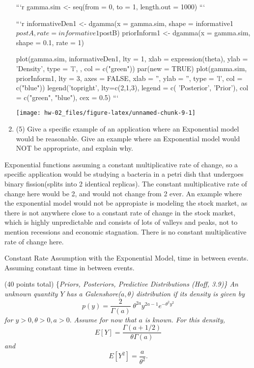 \documentclass[
]{article}
\begin{document}
\begin{enumerate}
```r
gamma.sim <- seq(from = 0, to = 1, length.out = 1000)
```

```r
informativeDen1 <- dgamma(x = gamma.sim, shape = informative1$postA, 
 rate = informative1$postB)
priorInform1 <- dgamma(x = gamma.sim, shape = 0.1, 
 rate = 1)

plot(gamma.sim, informativeDen1, lty = 1, xlab = expression(theta), ylab = 'Density',
 type = 'l', , col = c("green"))
par(new = TRUE)
plot(gamma.sim, priorInform1, lty = 3, axes = FALSE, xlab = '', ylab = '',
 type = 'l', col = c("blue"))
legend('topright', lty=c(2,1,3), legend = c( 'Posterior', 'Prior'),
       col = c("green", "blue"), cex = 0.5)
```



\begin{center}\texttt{[image: hw-02\_files/figure-latex/unnamed-chunk-9-1]} \end{center}


\item (5) Give a specific example of an application where an Exponential model would be reasonable. Give an example where an Exponential model would NOT be appropriate, and explain why.
\end{enumerate}

Exponential functions assuming a constant multiplicative rate of change,
so a specific application would be studying a bacteria in a petri dish
that undergoes binary fission(splits into 2 identical replicas). The
constant multiplicative rate of change here would be 2, and would not
change from 2 ever. An example where the exponential model would not be
appropiate is modeling the stock market, as there is not anywhere close
to a constant rate of change in the stock market, which is highly
unpredictable and consists of lots of valleys and peaks, not to mention
recessions and economic stagnation. There is no constant multiplicative
rate of change here.

Constant Rate Assumption with the Exponential Model, time in between
events. Assuming constant time in between events.

\item

(40 points total)
\{\em Priors, Posteriors, Predictive Distributions (Hoff, 3.9)\} An
unknown quantity \(Y\) has a Galenshore(\(a, \theta\)) distribution if
its density is given by
\[p(y) = \frac{2}{\Gamma(a)} \; \theta^{2a} y^{2a - 1} e^{-\theta^2 y^2}\]
for \(y>0, \theta >0, a>0.\) Assume for now that \(a\) is known. For
this density, \[E[Y] = \frac{\Gamma(a +1/2)}{\theta \Gamma(a)}\] and
\[E[Y^2] = \frac{a}{\theta^2}.\]
\end{document}
